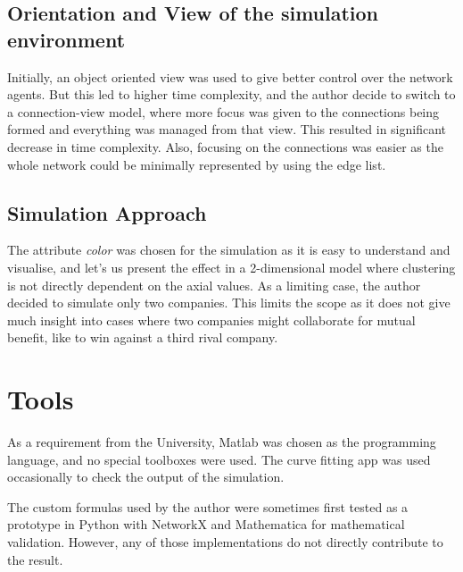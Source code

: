 \subsection{Orientation and View of the simulation environment}

Initially, an object oriented view was used to give better control over the network agents. But this led to higher time complexity, and the author decide to switch to a connection-view model, where more focus was given to the connections being formed and everything was managed from that view. This resulted in significant decrease in time complexity.
Also, focusing on the connections was easier as the whole network could be minimally represented by using the edge list.



\subsection{Simulation Approach}

The attribute \emph{color} was chosen for the simulation as it is easy to understand and visualise, and let's us present the effect in a 2-dimensional model where clustering is not directly dependent on the axial values. 
As a limiting case, the author decided to simulate only two companies. This limits the scope as it does not give much insight into cases where two companies might collaborate for mutual benefit, like to win against a third rival company.



\section{Tools}
As a requirement from the University, Matlab was chosen as the programming language, and no special toolboxes were used.
The curve fitting app was used occasionally to check the output of the simulation.

The custom formulas used by the author were sometimes first tested as a prototype in Python with NetworkX and Mathematica for mathematical validation. However, any of those implementations do not directly contribute to the result.
